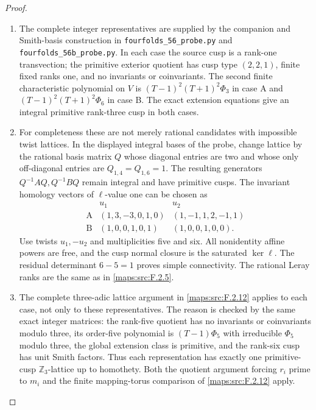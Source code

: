 \begin{proof}
\begin{enumerate}[label=\arabic*.]
\item The complete integer representatives are supplied by the
companion and Smith-basis construction in
\texttt{fourfolds\_56\_probe.py} and
\texttt{fourfolds\_56b\_probe.py}.
In each case the source cusp is a rank-one transvection;
the primitive exterior quotient has cusp type $(2,2,1)$,
finite fixed ranks one, and no invariants or coinvariants.
The second finite characteristic polynomial on $V$ is
$(T-1)^2(T+1)^2\Phi_3$ in case A and
$(T-1)^2(T+1)^2\Phi_6$ in case B.
The exact extension equations give an integral primitive
rank-three cusp in both cases.

\item For completeness these are not merely rational candidates
with impossible twist lattices.  In the displayed integral
bases of the probe, change lattice by the rational basis
matrix $Q$ whose diagonal entries are two and whose only
off-diagonal entries are $Q_{1,4}=Q_{1,6}=1$.
The resulting generators $Q^{-1}AQ,Q^{-1}BQ$ remain
integral and have primitive cusps.
The invariant homology vectors of $\ell$-value one can be
chosen as
\[
\begin{array}{c|cc}
 &u_1&u_2\\\hline
 \mathrm A&(1,3,-3,0,1,0)&(1,-1,1,2,-1,1)\\
 \mathrm B&(1,0,0,1,0,1)&(1,0,0,1,0,0).
\end{array}
\]
Use twists $u_1,-u_2$ and multiplicities five and six.
All nonidentity affine powers are free, and the cusp normal
closure is the saturated $\ker\ell$.
The residual determinant $6-5=1$ proves simple connectivity.
The rational Leray ranks are the same as in \ref{maps:src:F.2.5}.

\item The complete three-adic lattice argument in \ref{maps:src:F.2.12} applies
to each case, not only to these representatives.
The reason is checked by the same exact integer matrices:
the rank-five quotient has no invariants or coinvariants
modulo three, its order-five polynomial is
$(T-1)\Phi_5$ with irreducible $\Phi_5$ modulo three, the
global extension class is primitive, and the rank-six
cusp has unit Smith factors.
Thus each representation has exactly one primitive-cusp
$\mathbb Z_3$-lattice up to homothety.
Both the quotient argument forcing $r_i$ prime to $m_i$
and the finite mapping-torus comparison of \ref{maps:src:F.2.12} apply.


\end{enumerate}
\end{proof}
